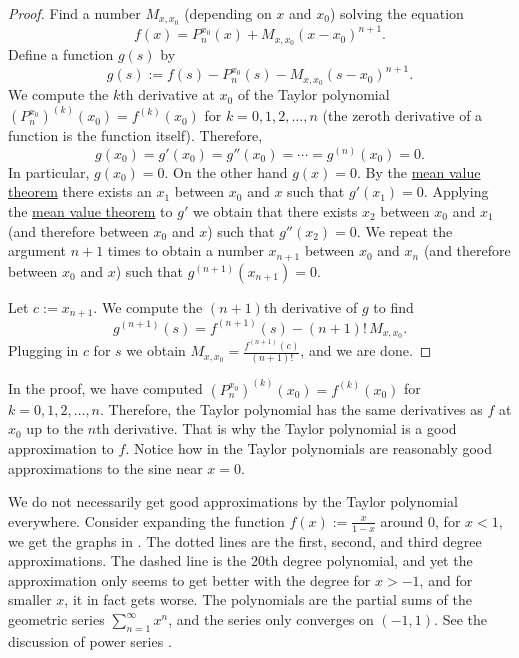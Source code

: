 \begin{proof}
Find a number $M_{x,x_0}$ (depending on $x$ and $x_0$) solving the equation
\begin{equation*}
f(x)=P_{n}^{x_0}(x)+M_{x,x_0}{(x-x_0)}^{n+1} .
\end{equation*}
Define a function $g(s)$ by
\begin{equation*}
g(s) := f(s)-P_n^{x_0}(s)-M_{x,x_0}{(s-x_0)}^{n+1} .
\end{equation*}
We compute
the $k$th derivative at $x_0$ of the Taylor polynomial
${(P_n^{x_0})}^{(k)}(x_0) = f^{(k)}(x_0)$ for
$k=0,1,2,\ldots,n$ (the zeroth derivative of a function is the function
itself).  Therefore,
\begin{equation*}
g(x_0) = g'(x_0) = g''(x_0) = \cdots = g^{(n)}(x_0) = 0 .
\end{equation*}
In particular, $g(x_0) = 0$.
On the other hand $g(x) = 0$.  By the
\hyperref[thm:mvt]{mean value theorem}
there exists an $x_1$ between $x_0$ and $x$ such that $g'(x_1) = 0$.
Applying the \hyperref[thm:mvt]{mean value theorem}
to $g'$ we obtain that there exists
$x_2$ between $x_0$ and $x_1$ (and therefore between $x_0$ and $x$)
such that $g''(x_2) = 0$.  We repeat the
argument $n+1$ times to obtain a number $x_{n+1}$ between $x_0$ and $x_n$
(and therefore between $x_0$ and $x$) such that $g^{(n+1)}(x_{n+1}) = 0$.

Let $c:=x_{n+1}$.
We compute the $(n+1)$th derivative of $g$ to find
\begin{equation*}
g^{(n+1)}(s) = f^{(n+1)}(s)-(n+1)!\,M_{x,x_0} .
\end{equation*}
Plugging in $c$ for $s$ we obtain $M_{x,x_0} = \frac{f^{(n+1)}(c)}{(n+1)!}$, and
we are done.
\end{proof}

In the proof, we have computed 
${(P_n^{x_0})}^{(k)}(x_0) = f^{(k)}(x_0)$ for $k=0,1,2,\ldots,n$.
Therefore, the Taylor polynomial has the same derivatives as $f$ at $x_0$
up to the $n$th derivative.  That is why the Taylor polynomial is
a good approximation to $f$.
Notice how in  the Taylor polynomials are
reasonably good approximations to the sine near $x=0$.

We do not necessarily get good approximations
by the Taylor polynomial everywhere.
Consider expanding the function $f(x) :=
\frac{x}{1-x}$ around 0, for $x < 1$, we get the graphs in
.  The dotted lines are the first, second, and
third degree approximations.  The dashed line is
the 20th degree polynomial, and yet the approximation only seems to get
better with the degree for $x > -1$, and for smaller $x$, it in fact gets worse.
The polynomials
are the partial sums of the geometric series $\sum_{n=1}^\infty x^n$,
and the series only converges on $(-1,1)$.
See the discussion of power series
.

